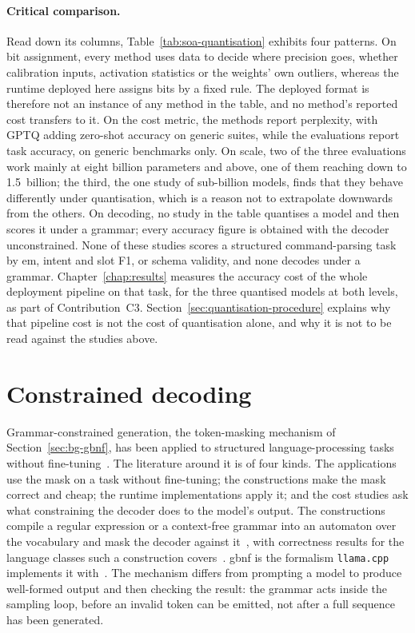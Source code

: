 \paragraph{Critical comparison.} Read down its columns, Table~\ref{tab:soa-quantisation}
exhibits four patterns. On bit assignment, every method uses data to decide where precision goes,
whether calibration inputs, activation statistics or the weights' own outliers, whereas the runtime
deployed here assigns bits by a fixed rule. The deployed format is therefore not an instance of
any method in the table, and no method's reported cost transfers to it. On the cost metric, the methods
report perplexity, with GPTQ adding zero-shot accuracy on generic suites, while the evaluations
report task accuracy, on generic benchmarks only. On scale, two of the three evaluations work
mainly at eight billion parameters and above, one of them reaching down to 1.5~billion; the third,
the one study of sub-billion models, finds that they behave differently under quantisation, which
is a reason not to extrapolate downwards from the others. On decoding, no study in the table quantises a model and
then scores it under a grammar; every accuracy figure is obtained with the decoder unconstrained.
None of these studies scores a structured command-parsing task by \gls{em}, intent and slot F1, or
schema validity, and none decodes under a grammar. Chapter~\ref{chap:results} measures the
accuracy cost of the whole deployment pipeline on that task, for the three quantised models at
both levels, as part of Contribution~C3. Section~\ref{sec:quantisation-procedure} explains why
that pipeline cost is not the cost of quantisation alone, and why it is not to be read against the
studies above.

\clearpage
\section{Constrained decoding}
\label{sec:soa-constrained-decoding}
Grammar-constrained generation, the token-masking mechanism of Section~\ref{sec:bg-gbnf}, has
been applied to structured language-processing tasks without fine-tuning~\cite{geng2023}. The
literature around it is of four kinds. The applications use the mask on a task without
fine-tuning; the constructions make the mask correct and cheap; the runtime implementations apply
it; and the cost studies ask what constraining the decoder does to the model's output. The constructions compile a regular expression or a
context-free grammar into an automaton over the vocabulary and mask the decoder against
it~\cite{willard2023,koo2024}, with correctness results for the language classes such a
construction covers~\cite{koo2024}. \Gls{gbnf} is the formalism \texttt{llama.cpp} implements it
with~\cite{llamacpp}. The mechanism differs from prompting a model to produce well-formed output
and then checking the result: the grammar acts inside the sampling loop, before an invalid token
can be emitted, not after a full sequence has been generated.

